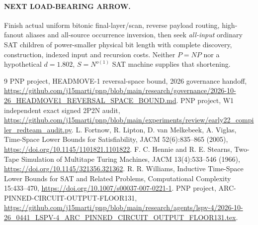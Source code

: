 \documentclass[11pt]{article}
\begin{document}
\paragraph{NEXT LOAD-BEARING ARROW.} Finish actual uniform
bitonic final-layer/scan, reverse payload routing, high-fanout
aliases and all-source occurrence inversion, then seek
\emph{all-input} ordinary SAT children of power-smaller physical
bit length with complete discovery, construction, indexed input
and recursion costs. Neither $P=NP$ nor a hypothetical
$d=1.802$, $S=N^{o(1)}$ SAT machine supplies that shortening.

\begin{thebibliography}{9}
 PNP project, HEADMOVE-1 reversal-space bound,
2026 governance handoff,
\url{https://github.com/j15marti/pnp/blob/main/research/governance/2026-10-26_HEADMOVE1_REVERSAL_SPACE_BOUND.md}.
 PNP project, W1 independent exact signed 2P2N audit,
\url{https://github.com/j15marti/pnp/blob/main/experiments/review/early22_compiler_redteam_audit.py}.
 L. Fortnow, R. Lipton, D. van Melkebeek,
A. Viglas, Time-Space Lower Bounds for Satisfiability,
JACM 52(6):835--865 (2005),
\url{https://doi.org/10.1145/1101821.1101822}.
 F. C. Hennie and R. E. Stearns,
Two-Tape Simulation of Multitape Turing Machines,
JACM 13(4):533--546 (1966),
\url{https://doi.org/10.1145/321356.321362}.
 R. R. Williams, Inductive Time-Space Lower Bounds
for SAT and Related Problems, Computational Complexity 15:433--470,
\url{https://doi.org/10.1007/s00037-007-0221-1}.
 PNP project, ARC-PINNED-CIRCUIT-OUTPUT-FLOOR131,
\url{https://github.com/j15marti/pnp/blob/main/research/agents/lspv-4/2026-10-26_0441_LSPV-4_ARC_PINNED_CIRCUIT_OUTPUT_FLOOR131.tex}.
\end{thebibliography}
\end{document}
